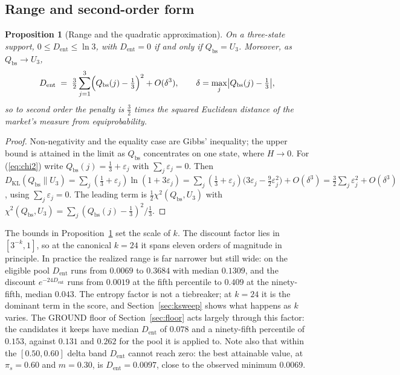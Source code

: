 \documentclass[11pt]{article}
\newtheorem{proposition}{Proposition}
\newcommand{\dkl}{D_{\mathrm{KL}}}
\newcommand{\dent}{D_{\mathrm{ent}}}
\newcommand{\Qbs}{Q_{\mathrm{bs}}}
\begin{document}
\subsection{Range and second-order form}

\begin{proposition}[Range and the quadratic approximation]
\label{prop:range}
On a three-state support, $0 \leq \dent \leq \ln 3$, with $\dent = 0$ if and
only if $\Qbs = U_3$. Moreover, as $\Qbs \to U_3$,
\begin{equation}
\dent \;=\; \tfrac32 \sum_{j=1}^{3}\Bigl(\Qbs(j) - \tfrac13\Bigr)^2
+ O(\delta^3), \qquad \delta = \max_j \bigl|\Qbs(j) - \tfrac13\bigr| ,
\label{eq:chi2}
\end{equation}
so to second order the penalty is $\tfrac32$ times the squared Euclidean
distance of the market's measure from equiprobability.
\end{proposition}

\begin{proof}
Non-negativity and the equality case are Gibbs' inequality; the upper bound is
attained in the limit as $\Qbs$ concentrates on one state, where
$H \to 0$. For (\ref{eq:chi2}) write $\Qbs(j) = \tfrac13 + \varepsilon_j$ with
$\sum_j \varepsilon_j = 0$. Then
$\dkl(\Qbs \| U_3) = \sum_j (\tfrac13 + \varepsilon_j)
\ln(1 + 3\varepsilon_j)
= \sum_j (\tfrac13 + \varepsilon_j)\bigl(3\varepsilon_j -
\tfrac92 \varepsilon_j^2\bigr) + O(\delta^3)
= \tfrac32 \sum_j \varepsilon_j^2 + O(\delta^3)$,
using $\sum_j \varepsilon_j = 0$. The leading term is
$\tfrac12 \chi^2(\Qbs, U_3)$ with
$\chi^2(\Qbs, U_3) = \sum_j (\Qbs(j) - \tfrac13)^2/\tfrac13$.
\end{proof}

The bounds in Proposition~\ref{prop:range} set the scale of $k$. The discount
factor lies in $[3^{-k}, 1]$, so at the canonical $k = 24$ it spans eleven
orders of magnitude in principle. In practice the realized range is far
narrower but still wide: on the eligible pool $\dent$ runs from $0.0069$ to
$0.3684$ with median $0.1309$, and the discount $e^{-24\dent}$ runs from
$0.0019$ at the fifth percentile to $0.409$ at the ninety-fifth, median
$0.043$. The entropy factor is not a tiebreaker; at $k = 24$ it is the
dominant term in the score, and Section~\ref{sec:ksweep} shows what
happens as $k$ varies. The GROUND floor of Section~\ref{sec:floor} acts
largely through this factor: the candidates it keeps have median $\dent$ of
$0.078$ and a ninety-fifth percentile of $0.153$, against $0.131$ and $0.262$
for the pool it is applied to. Note also that within the $[0.50, 0.60]$ delta band
$\dent$ cannot reach zero: the best attainable value, at $\pi_s = 0.60$ and
$m = 0.30$, is $\dent = 0.0097$, close to the observed minimum $0.0069$.
\end{document}
